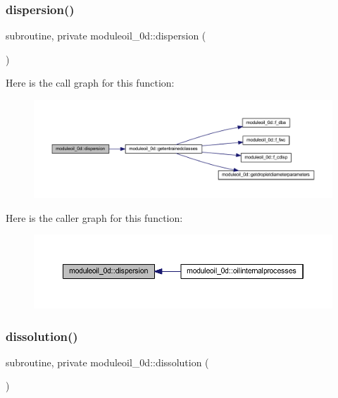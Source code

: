 \subsubsection{\texorpdfstring{dispersion()}{dispersion()}}
{\footnotesize\ttfamily subroutine, private moduleoil\+\_\+0d\+::dispersion (\begin{DoxyParamCaption}{ }\end{DoxyParamCaption})\hspace{0.3cm}{\ttfamily [private]}}

Here is the call graph for this function\+:\nopagebreak
\begin{figure}[H]
\begin{center}
\leavevmode
\includegraphics[width=350pt]{namespacemoduleoil__0d_acebfecd3789a27099dd53ae338cb4b64_cgraph}
\end{center}
\end{figure}
Here is the caller graph for this function\+:\nopagebreak
\begin{figure}[H]
\begin{center}
\leavevmode
\includegraphics[width=350pt]{namespacemoduleoil__0d_acebfecd3789a27099dd53ae338cb4b64_icgraph}
\end{center}
\end{figure}
\mbox{\label{namespacemoduleoil__0d_a5b8886545b16a4515a2adcc5ae3f6573}} 
\subsubsection{\texorpdfstring{dissolution()}{dissolution()}}
{\footnotesize\ttfamily subroutine, private moduleoil\+\_\+0d\+::dissolution (\begin{DoxyParamCaption}{ }\end{DoxyParamCaption})\hspace{0.3cm}{\ttfamily [private]}}


